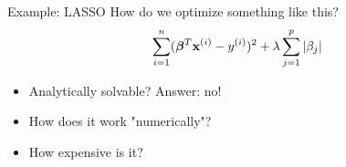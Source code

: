 \documentclass[11pt,compress,t,notes=noshow, xcolor=table]{beamer}
\begin{document}
\begin{vbframe}{Example: LASSO}
 How do we optimize something like this?
  $$\sum\limits_{i=1}^n (\bm{\beta}^T \mathbf{x}^{(i)} - y^{(i)})^2 + \lambda \sum\limits_{j=1}^p |\beta_j|$$

  \begin{itemize}
    \item Analytically solvable? Answer: no!
    \item How does it work "numerically"?
    \item How expensive is it?
  \end{itemize}
\end{vbframe}



\endlecture
\end{document}
